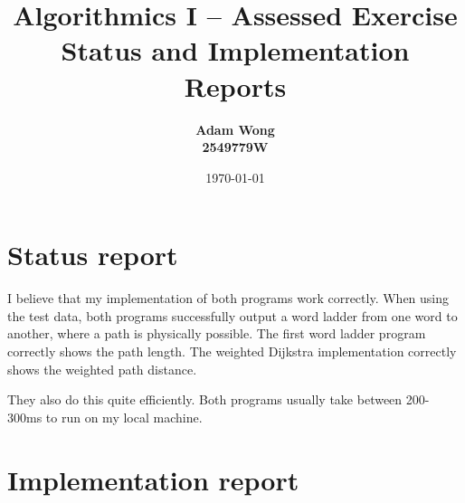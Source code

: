 \documentclass[11pt]{article}
\title{Algorithmics I --  Assessed Exercise\\ \vspace{4mm} 
Status and Implementation Reports}
\author{\bf Adam Wong\\ \bf 2549779W}
\date{\today}
\begin{document}
\maketitle

\section*{Status report}

I believe that my implementation of both programs work correctly. When using the test data, both programs successfully output a word ladder from one word to another, where a path is physically possible. The first word ladder program correctly shows the path length. The weighted Dijkstra implementation correctly shows the weighted path distance.

They also do this quite efficiently. Both programs usually take between 200-300ms to run on my local machine.

\section*{Implementation report}
\end{document}
